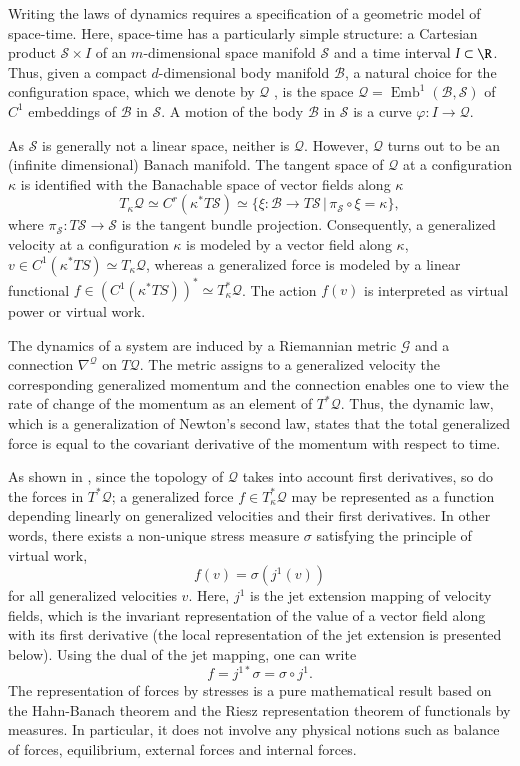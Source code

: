 \documentclass[smallextended]{svjour3}
\begin{document}
Writing  the laws of dynamics requires a specification of  a geometric model of space-time. Here, space-time has a particularly simple structure: a Cartesian product ${\mathcal{S}}\times I$ of an $m$-dimensional space manifold ${\mathcal{S}}$ and a time interval  $I\subset\R$. Thus, given a compact $d$-dimensional body manifold ${\mathcal{B}}$, a natural choice for the configuration space, which we denote  by ${\mathcal{Q}}$ , is the space ${\mathcal{Q}}={\operatorname{Emb}}^1({\mathcal{B}},{\mathcal{S}})$ of $C^1$ embeddings of ${\mathcal{B}}$ in ${\mathcal{S}}$. A motion of the body ${\mathcal{B}}$ in ${\mathcal{S}}$ is a curve ${\varphi}:I\to{\mathcal{Q}}$. 

As ${\mathcal{S}}$ is generally not a linear space, neither is ${\mathcal{Q}}$. However, ${\mathcal{Q}}$ turns out to be an (infinite dimensional) Banach manifold. The tangent space of ${\mathcal{Q}}$ at a configuration $\kappa$  is identified with the Banachable space of vector fields along $\kappa$ 
\[
T_\kappa{\mathcal{Q}}\simeq C^r(\kappa^*T{\mathcal{S}})\simeq\{\xi:{\mathcal{B}}\to T{\mathcal{S}}\,|\,\pi_{\mathcal{S}}\circ\xi=\kappa\},
\]
 where $\pi_{\mathcal{S}}:T{\mathcal{S}}\to {\mathcal{S}}$ is the tangent bundle projection.  Consequently, a  generalized velocity at a configuration $\kappa$ is modeled by a vector field along $\kappa$, $v\in C^1({\kappa^*TS})\simeq T_\kappa{\mathcal{Q}}$, whereas  a generalized force is modeled by a linear functional  $f\in (C^1({\kappa^*TS}))^*\simeq T_\kappa^*{\mathcal{Q}}$. The action $f(v)$ is interpreted as virtual power or virtual work.

The dynamics of a system are induced by a Riemannian metric ${\mathcal{G}}$ and a connection $\nabla^{\mathcal{Q}}$ on $T{\mathcal{Q}}$. The metric assigns to a generalized velocity the corresponding generalized momentum and the connection enables one to view the rate of change of the momentum as an element of $T^*{\mathcal{Q}}$. Thus, the dynamic law, which is a generalization of Newton's second law, states that the total generalized force is equal to the covariant derivative of the momentum with respect to time.
 
As shown in \cite{Seg86}, since the topology of ${\mathcal{Q}}$ takes into account first derivatives, so do the forces in $T^*{\mathcal{Q}}$;  a generalized force $f\in T^*_\kappa{\mathcal{Q}}$ may be represented as a function depending linearly on generalized velocities and their first derivatives. In other words, there exists a non-unique stress measure $\sigma$  satisfying the principle of virtual work, 
\[
f(v)=\sigma(j^1(v))
\]
for all generalized velocities $v$. Here, $j^1$ is the jet extension mapping of velocity fields, which is the invariant representation of the value of a vector field along  with its first derivative (the local representation of the jet extension is presented below).
Using the dual of the jet mapping, one can write
\[
f=j^{1*}\sigma=\sigma\circ j^1.
\]
The representation of forces by stresses is a pure mathematical result based on the Hahn-Banach theorem and the Riesz representation theorem of functionals by measures. In particular, it does not involve any physical notions such as balance of forces, equilibrium, external forces and internal forces. 
\end{document}

